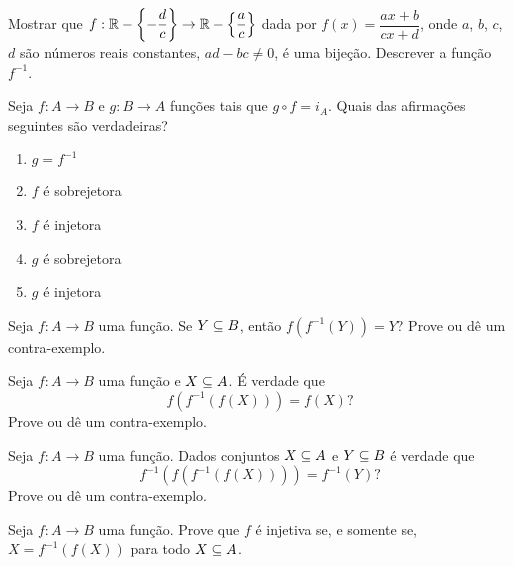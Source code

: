\documentclass[12pt]{exam}
\begin{document}
    \vspace{.3cm}

    \questao{} Mostrar que $f : \mathbb{R} - \left\{-\dfrac{d}{c}\right\} \to \mathbb{R}  - \left\{\dfrac{a}{c}\right\}$ dada por $f(x) =  \dfrac{ax + b}{cx + d}$, onde $a$, $b$, $c$, $d$ s{\~a}o n{\'u}meros reais constantes, $ad - bc \ne 0$, {\'e} uma bije{\c c}{\~a}o. Descrever a fun{\c c}{\~a}o $f^{-1}$.

    \vspace{.3cm}

    \questao{} Seja $f : A \to B$ e $g : B \to A$ fun\c{c}\~oes tais que $g \circ f = i_A$. Quais das afirma\c{c}\~oes seguintes s\~ao verdadeiras?
    \begin{enumerate}[label={\alph*})]
        \item $g = f^{-1}$

        \item $f$ \'e sobrejetora

        \item $f$ \'e injetora

        \item $g$ \'e sobrejetora

        \item $g$ \'e injetora
    \end{enumerate}

    \vspace{.3cm}

    \questao{} Seja $f : A \to B$ uma fun\c{c}\~ao. Se $Y \subseteq B$, ent\~ao $f(f^{-1}(Y)) = Y$? Prove ou d\^e um contra-exemplo.

    \vspace{.3cm}

    \questao{} Seja $f : A \to B$ uma fun\c{c}\~ao e $X \subseteq A$. \'E verdade que
    \[
        f(f^{-1}(f(X))) = f(X)?
    \]
    Prove ou d\^e um contra-exemplo.

    \vspace{.3cm}

    \questao{} Seja $f : A \to B$ uma fun\c{c}\~ao. Dados conjuntos $X \subseteq A$ e $Y \subseteq B$ \'e verdade que
    \[
        f^{-1}(f(f^{-1}(f(X)))) = f^{-1}(Y)?
    \]
    Prove ou d\^e um contra-exemplo.

    \vspace{.3cm}

    \questao{} Seja $f : A \to B$ uma fun\c{c}\~ao. Prove que $f$ \'e injetiva se, e somente se, $X = f^{-1}(f(X))$ para todo $X \subseteq A$.

    \vspace{.3cm}
\end{document}
